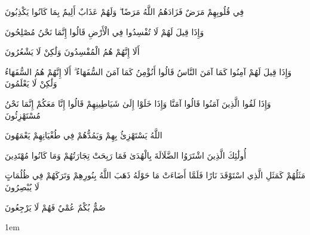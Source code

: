 {{{{فِي قُلُوبِهِمْ مَرَضٌ فَزَادَهُمُ اللَّهُ مَرَضًا ۖ وَلَهُمْ عَذَابٌ أَلِيمٌ بِمَا كَانُوا يَكْذِبُونَ

وَإِذَا قِيلَ لَهُمْ لَا تُفْسِدُوا فِي الْأَرْضِ قَالُوا إِنَّمَا نَحْنُ مُصْلِحُونَ

أَلَا إِنَّهُمْ هُمُ الْمُفْسِدُونَ وَلَٰكِنْ لَا يَشْعُرُونَ

وَإِذَا قِيلَ لَهُمْ آمِنُوا كَمَا آمَنَ النَّاسُ قَالُوا أَنُؤْمِنُ كَمَا آمَنَ السُّفَهَاءُ ۗ أَلَا إِنَّهُمْ هُمُ السُّفَهَاءُ وَلَٰكِنْ لَا يَعْلَمُونَ

وَإِذَا لَقُوا الَّذِينَ آمَنُوا قَالُوا آمَنَّا وَإِذَا خَلَوْا إِلَىٰ شَيَاطِينِهِمْ قَالُوا إِنَّا مَعَكُمْ إِنَّمَا نَحْنُ مُسْتَهْزِئُونَ

اللَّهُ يَسْتَهْزِئُ بِهِمْ وَيَمُدُّهُمْ فِي طُغْيَانِهِمْ يَعْمَهُونَ

أُولَٰئِكَ الَّذِينَ اشْتَرَوُا الضَّلَالَةَ بِالْهُدَىٰ فَمَا رَبِحَتْ تِجَارَتُهُمْ وَمَا كَانُوا مُهْتَدِينَ

مَثَلُهُمْ كَمَثَلِ الَّذِي اسْتَوْقَدَ نَارًا فَلَمَّا أَضَاءَتْ مَا حَوْلَهُ ذَهَبَ اللَّهُ بِنُورِهِمْ وَتَرَكَهُمْ فِي ظُلُمَاتٍ لَا يُبْصِرُونَ

صُمٌّ بُكْمٌ عُمْيٌ فَهُمْ لَا يَرْجِعُونَ
 \par  \beginR} }}}

\koran\kern1em\koran
\makeatletter\@specialfalse\makeatother    